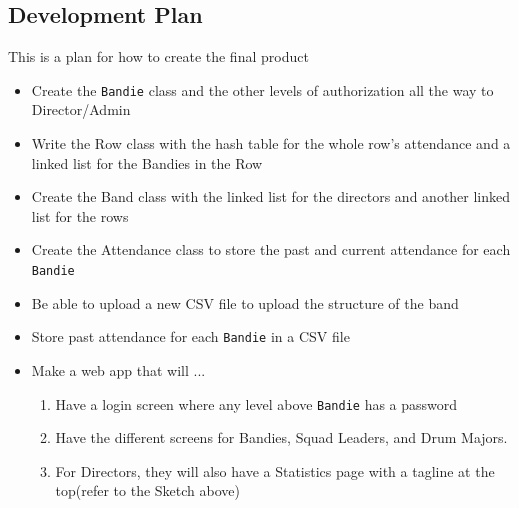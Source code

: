 \documentclass{article}
\begin{document}
\subsection{Development Plan}
This is a plan for how to create the final product
\begin{itemize}
	\item Create the \verb|Bandie| class and the other levels of authorization all the way to Director/Admin
	\item Write the Row class with the hash table for the whole row’s attendance and a linked list for the Bandies in the Row
	\item Create the Band class with the linked list for the directors and another linked list for the rows
	\item Create the Attendance class to store the past and current attendance for each \verb|Bandie|
	\item Be able to upload a new CSV file to upload the structure of the band
	\item Store past attendance for each \verb|Bandie| in a CSV file
	\item Make a web app that will ...
		\begin{enumerate}
			\item Have a login screen where any level above \verb|Bandie| has a password
			\item Have the different screens for Bandies, Squad Leaders, and Drum Majors.
			\item For Directors, they will also have a Statistics page with a tagline at the top(refer to the Sketch above)
		\end{enumerate}
\end{itemize}
\end{document}
